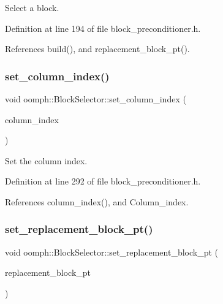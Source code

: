 Select a block. 



Definition at line 194 of file block\+\_\+preconditioner.\+h.



References build(), and replacement\+\_\+block\+\_\+pt().

\mbox{\label{classoomph_1_1BlockSelector_acb7166a82872ba91c5da1574a4dd8b62}} 
\subsubsection{\texorpdfstring{set\+\_\+column\+\_\+index()}{set\_column\_index()}}
{\footnotesize\ttfamily void oomph\+::\+Block\+Selector\+::set\+\_\+column\+\_\+index (\begin{DoxyParamCaption}\item[{const unsigned \&}]{column\+\_\+index }\end{DoxyParamCaption})\hspace{0.3cm}{\ttfamily [inline]}}



Set the column index. 



Definition at line 292 of file block\+\_\+preconditioner.\+h.



References column\+\_\+index(), and Column\+\_\+index.

\mbox{\label{classoomph_1_1BlockSelector_af98391ac49a8717eb6b2fbe0995222be}} 
\subsubsection{\texorpdfstring{set\+\_\+replacement\+\_\+block\+\_\+pt()}{set\_replacement\_block\_pt()}}
{\footnotesize\ttfamily void oomph\+::\+Block\+Selector\+::set\+\_\+replacement\+\_\+block\+\_\+pt (\begin{DoxyParamCaption}\item[{\hyperlink{classoomph_1_1CRDoubleMatrix}{C\+R\+Double\+Matrix} $\ast$}]{replacement\+\_\+block\+\_\+pt }\end{DoxyParamCaption})\hspace{0.3cm}{\ttfamily [inline]}}



